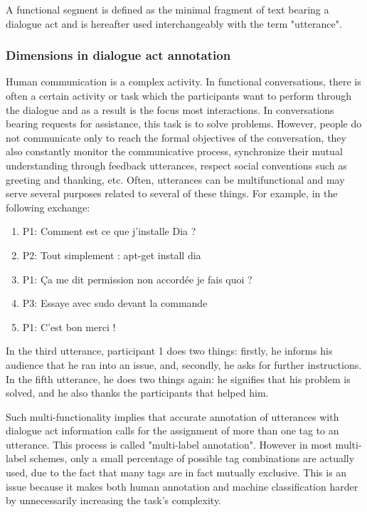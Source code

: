 A functional segment is defined as the minimal fragment of text bearing a dialogue act and is hereafter used interchangeably with the term "utterance".

\subsubsection{Dimensions in dialogue act annotation}

Human communication is a complex activity. In functional conversations, there is often a certain activity or task which the participants want to perform through the dialogue and as a result is the focus most interactions. In conversations bearing requests for assistance, this task is to solve problems. However, people do not communicate only to reach the formal objectives of the conversation, they also constantly monitor the communicative process, synchronize their mutual understanding through feedback utterances, respect social conventions such as greeting and thanking, etc. Often, utterances can be multifunctional and may serve several purposes related to several of these things. For example, in the following exchange:

\begin{enumerate}
	\item P1: Comment est ce que j'installe Dia ?
	\item P2: Tout simplement : apt-get install dia
	\item P1: Ça me dit permission non accordée je fais quoi ? 
	\item P3: Essaye avec sudo devant la commande
	\item P1: C'est bon merci !
\end{enumerate}

In the third utterance, participant 1 does two things: firstly, he informs his audience that he ran into an issue, and, secondly, he asks for further instructions. In the fifth utterance, he does two things again: he signifies that his problem is solved, and he also thanks the participants that helped him.

Such multi-functionality implies that accurate annotation of utterances with dialogue act information calls for the assignment of more than one tag to an utterance. This process is called "multi-label annotation". However in most multi-label schemes, only a small percentage of possible tag combinations are actually used, due to the fact that many tags are in fact mutually exclusive. This is an issue because it makes both human annotation and machine classification harder by unnecessarily increasing the task's complexity.

